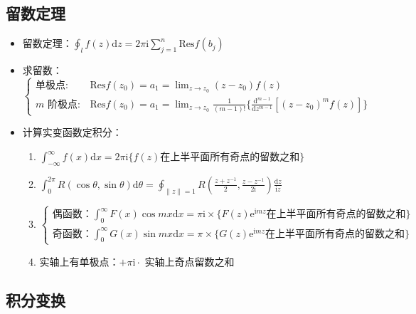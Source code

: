 \documentclass{article}
\begin{document}
\subsection{留数定理}

\begin{itemize}
    \item 留数定理：$\oint_lf(z)\mathrm{d}z=2\pi\mathrm{i}\sum^n_{j=1}\mathrm{Res}f(b_j)$
    \item 求留数：$\begin{cases}\text{单极点}:&\mathrm{Res}f(z_0)=a_1=\lim_{z\to z_0}(z-z_0)f(z)\\ m \text{ 阶极点}:&\mathrm{Res}f(z_0)=a_1=\lim_{z\to z_0}\frac{1}{(m-1)!}\{\frac{\mathrm{d}^{m-1}}{\mathrm{d}z^{m-1}}[(z-z_0)^mf(z)]\}\end{cases}$
    \item 计算实变函数定积分：\begin{enumerate}
              \item $\int^{\infty}_{-\infty}f(x)\mathrm{d}x=2\pi\mathrm{i}\{f(z) \text{在上半平面所有奇点的留数之和}\}$
              \item $\int^{2\pi}_0R(\cos\theta,\sin\theta)\mathrm{d}\theta=\oint_{\|z\|=1}R(\frac{z+z^{-1}}{2}, \frac{z-z^{-1}}{2\mathrm{i}})\frac{\mathrm{d}z}{\mathrm{i}z}$
              \item $\begin{cases}\text{偶函数：}\int^\infty_0 F(x)\cos mx\mathrm{d}x=\pi\mathrm{i} \times \{F(z)\mathrm{e}^{\mathrm{i}mz}\text{在上半平面所有奇点的留数之和}\}\\
              \text{奇函数：}\int^\infty_0 G(x)\sin mx\mathrm{d}x=\pi \times \{G(z)\mathrm{e}^{\mathrm{i}mz}\text{在上半平面所有奇点的留数之和}\}\end{cases}$
              \item 实轴上有单极点：$+\pi\mathrm{i}\cdot$ 实轴上奇点留数之和
          \end{enumerate}
\end{itemize}

\subsection{积分变换}
\end{document}
